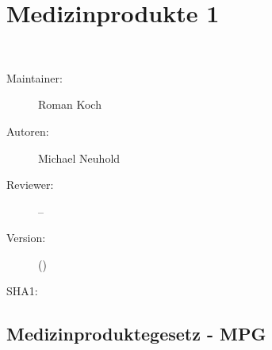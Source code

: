 % 
\def\ChapterCode{MP1}
\chapter
[\CO{[MP1]} Medizinprodukte 1]
{Medizinprodukte 1}
\label{chp:GER}
\label{chp:MP1}

\ChapterIntro
{%
~
}
{%
\begin{description}
  \item[Maintainer:] Roman Koch
  \item[Autoren:] Michael Neuhold
  \item[Reviewer:] --
  \item[Version:] {\DocVersion} ({\DocVersionInfo})
  \item[SHA1:] {\DocGitCommit}
\end{description}

{\TxTeilkapitelAASS}
}


\clearpage %


\section{Medizinproduktegesetz - MPG}
\label{topic:mpg-info}

